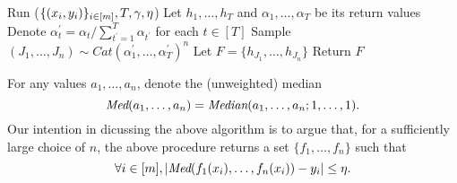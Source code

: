 \begin{algorithm}[h]
  \caption{($\{(x_i,y_i)\}_{i\in[m]},\adv,T,n$)}
  \begin{algorithmic}[1]
    \State Run ($\{(x_i,y_i)\}_{i\in[m]},T,\gamma,\eta$)
    \State Let $h_{1},\ldots,h_{T}$ and $\alpha_{1},\ldots,\alpha_{T}$ be its return values 
    \State Denote $\alpha_{t}^{\prime} = \alpha_{t} / \sum_{t^{\prime}=1}^{T} \alpha_{t^{\prime}}$ for each $t\in[T]$
    \Repeat
      \State Sample $(J_{1},\ldots,J_{n}) \sim Cat(\alpha_{1}^{\prime},\ldots,\alpha_{T}^{\prime})^{n}$ %
      \State Let $F = \{ h_{J_{1}},\ldots, h_{J_{n}} \}$
      \State Return $F$
  \end{algorithmic}
\end{algorithm}

For any values $a_{1},\ldots,a_{n}$, denote the (unweighted) median 
\begin{equation*}
\emph{Med}(a_{1},\ldots,a_{n}) = \emph{Median}(a_{1},\ldots,a_{n}; 1,\ldots,1).
\end{equation*}
Our intention in dicussing the above algorithm is to argue that, for a sufficiently large choice of $n$, 
the above procedure returns a set $\{f_{1},\ldots,f_{n}\}$ such that 
\[
\forall i\in[m], | \emph{Med}(f_{1}(x_{i}),\ldots,f_{n}(x_{i})) - y_{i} | \leq \eta.
\]

